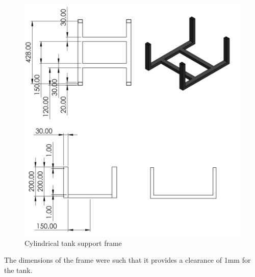 \begin{itemize}
\begin{figure}[H]
    \centering
    \includegraphics[height=.55\textheight]{Figures/tankHolder.PNG}
    \caption{Cylindrical tank support frame}
    \label{fig:cylindrical_tank_support_frame}
\end{figure}

The dimensions of the frame were such that it provides a clearance of 1mm for the tank.


\end{itemize}
